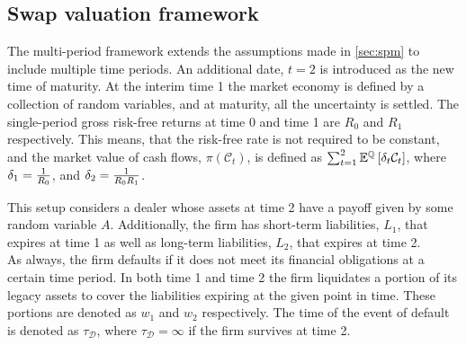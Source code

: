 \documentclass[main.tex]{subfiles}
\begin{document}
    \subsection{Swap valuation framework}
        The multi-period framework extends the assumptions made in \cref{sec:spm} to include multiple time periods.
        An additional date, $t=2$ is introduced as the new time of maturity.
        At the interim time 1 the market economy is defined by a collection of random variables,
        and at maturity, all the uncertainty is settled. 
        The single-period gross risk-free returns at time 0 and time 1 are $R_0$ and $R_1$ respectively. This means, that the risk-free rate is not required to be constant, and the market value of cash flows, $\pi(\mathcal{C}_{t})$, is defined as $\sum_{t=1}^{2}\mathbb{E}^{\mathbb{Q}}\left[\delta_t \mathcal{C}_{t}\right]$, where $\delta_1 = \frac{1}{R_{0}}$, and $\delta_2 = \frac{1}{R_{0}R_{1}}$.

        This setup considers a dealer whose assets at time 2 have a payoff given by some random variable $A$. Additionally, the firm has short-term liabilities, $L_1$, that expires at time 1 as well as long-term liabilities, $L_2$, that expires at time 2.
        \\
        As always, the firm defaults if it does not meet its financial obligations at a certain time period. In both time 1 and time 2 the firm liquidates a portion of its legacy assets to cover the liabilities expiring at the given point in time. These portions are denoted as $w_{1}$ and $w_{2}$ respectively. The time of the event of default is denoted as $\tau_{\mathcal{D}}$, where $\tau_{\mathcal{D}} = \infty$ if the firm survives at time 2.
\end{document}
